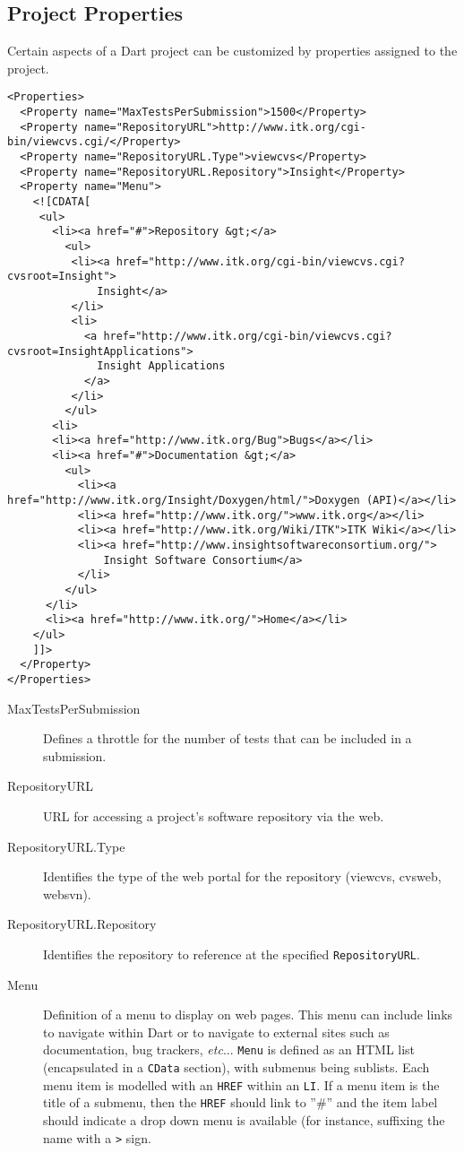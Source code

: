 \documentclass{InsightBook}
\makeatletter
\DeclareRobustCommand\onedot{\futurelet\@let@token\@onedot}
\def\@onedot{\ifx\@let@token.\else.\xspace\fi}
\def\etc{\emph{etc}\onedot}
\makeatother
\begin{document}
\subsection{Project Properties}
Certain aspects of a Dart project can be customized by properties
assigned to the project.
\begin{verbatim}
<Properties>
  <Property name="MaxTestsPerSubmission">1500</Property>
  <Property name="RepositoryURL">http://www.itk.org/cgi-bin/viewcvs.cgi/</Property>
  <Property name="RepositoryURL.Type">viewcvs</Property>
  <Property name="RepositoryURL.Repository">Insight</Property>
  <Property name="Menu">
    <![CDATA[
     <ul>
       <li><a href="#">Repository &gt;</a>
         <ul>
          <li><a href="http://www.itk.org/cgi-bin/viewcvs.cgi?cvsroot=Insight">
              Insight</a>
          </li>
          <li>
            <a href="http://www.itk.org/cgi-bin/viewcvs.cgi?cvsroot=InsightApplications">
              Insight Applications
            </a>
          </li>
         </ul>
       <li>
       <li><a href="http://www.itk.org/Bug">Bugs</a></li>
       <li><a href="#">Documentation &gt;</a>
         <ul>
           <li><a href="http://www.itk.org/Insight/Doxygen/html/">Doxygen (API)</a></li>
           <li><a href="http://www.itk.org/">www.itk.org</a></li>
           <li><a href="http://www.itk.org/Wiki/ITK">ITK Wiki</a></li>
           <li><a href="http://www.insightsoftwareconsortium.org/">
               Insight Software Consortium</a>
           </li>
         </ul>
      </li>
      <li><a href="http://www.itk.org/">Home</a></li>
    </ul>
    ]]>
  </Property>
</Properties>
\end{verbatim}

\begin{description}
\item[MaxTestsPerSubmission]{Defines a throttle for the number of tests that can be included in a submission.}
\item[RepositoryURL]{URL for accessing a project's software repository via the web.}
\item[RepositoryURL.Type]{Identifies the type of the web portal for the repository (viewcvs, cvsweb, websvn).}
\item[RepositoryURL.Repository]{Identifies the repository to reference at the specified \texttt{RepositoryURL}}.
\item[Menu]{Definition of a menu to display on web pages.  This menu can include links to navigate within Dart or to navigate to external sites such as documentation, bug trackers, \etc.  \texttt{Menu} is defined as an HTML list (encapsulated in a \texttt{CData} section), with submenus being sublists.  Each menu item is modelled with an \texttt{HREF} within an \texttt{LI}. If a menu item is the title of a submenu, then the \texttt{HREF} should link to ''\#'' and the item label should indicate a drop down menu is available (for instance, suffixing the name with a \texttt{>} sign.  }
\end{description}
\end{document}
